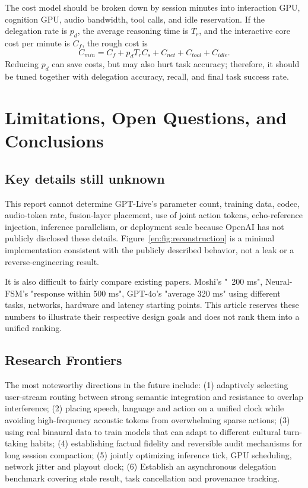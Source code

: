 \documentclass[UTF8,fontset=none,a4paper,10pt]{ctexart}
\begin{document}
The cost model should be broken down by session minutes into interaction GPU, cognition GPU, audio bandwidth, tool calls, and idle reservation. If the delegation rate is $p_d$, the average reasoning time is $T_r$, and the interactive core cost per minute is $C_f$, the rough cost is
\begin{equation}
C_{min}=C_f+p_dT_rC_s+C_{net}+C_{tool}+C_{idle}.
\end{equation}
Reducing $p_d$ can save costs, but may also hurt task accuracy; therefore, it should be tuned together with delegation accuracy, recall, and final task success rate.

\section{Limitations, Open Questions, and Conclusions}

\subsection{Key details still unknown}

This report cannot determine GPT-Live's parameter count, training data, codec, audio-token rate, fusion-layer placement, use of joint action tokens, echo-reference injection, inference parallelism, or deployment scale because OpenAI has not publicly disclosed these details. Figure~\ref{en:fig:reconstruction} is a minimal implementation consistent with the publicly described behavior, not a leak or a reverse-engineering result.

It is also difficult to fairly compare existing papers. Moshi's "~200 ms", Neural-FSM's "response within 500 ms", GPT-4o's "average 320 ms" using different tasks, networks, hardware and latency starting points. This article reserves these numbers to illustrate their respective design goals and does not rank them into a unified ranking.

\subsection{Research Frontiers}

The most noteworthy directions in the future include: (1) adaptively selecting user-stream routing between strong semantic integration and resistance to overlap interference; (2) placing speech, language and action on a unified clock while avoiding high-frequency acoustic tokens from overwhelming sparse actions; (3) using real binaural data to train models that can adapt to different cultural turn-taking habits; (4) establishing factual fidelity and reversible audit mechanisms for long session compaction; (5) jointly optimizing inference tick, GPU scheduling, network jitter and playout clock; (6) Establish an asynchronous delegation benchmark covering stale result, task cancellation and provenance tracking.
\end{document}
